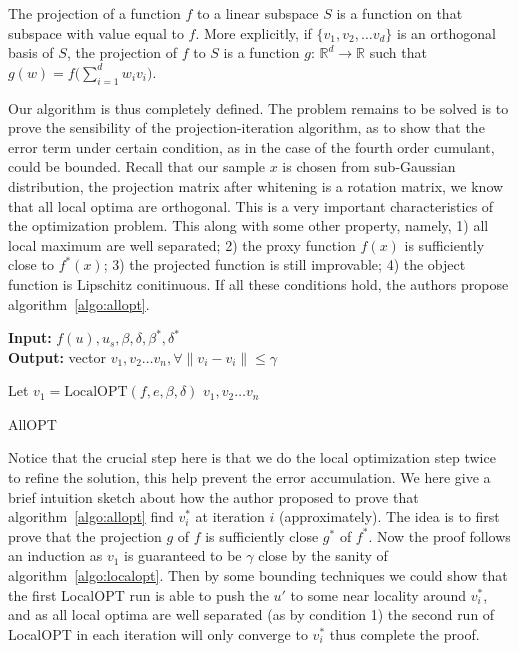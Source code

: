 \begin{definition}
    The projection of a function $f$ to a linear subspace $S$ is a function on that subspace with value equal to $f$. More explicitly, if $\{v_1, v_2, \dots v_d\}$ is an orthogonal basis of $S$, the projection of $f$ to $S$ is a function $g$: $\mathbb{R}^d \rightarrow \mathbb{R}$ such that $g(w) = f\big(\sum_{i = 1}^d w_iv_i\big)$.
\end{definition}

Our algorithm is thus completely defined. The problem remains to be
solved is to prove the sensibility of the projection-iteration
algorithm, as to show that the error term under certain condition, as
in the case of the fourth order cumulant, could be bounded. Recall
that our sample $x$ is chosen from sub-Gaussian distribution, the
projection matrix after whitening is a rotation matrix, we know that
all local optima are orthogonal. This is a very important
characteristics of the optimization problem. This along with some
other property, namely, 1) all local maximum are well separated; 2)
the proxy function $f(x)$ is sufficiently close to $f^*(x)$; 3) the
projected function is still improvable; 4) the object function is
Lipschitz conitinuous. If all these conditions hold, the authors
propose algorithm~\ref{algo:allopt}.

\begin{algorithm}[t]
\hspace*{\algorithmicindent} \textbf{Input:} $f(u), u_s, \beta, \delta, \beta^*, \delta^*$\\
\hspace*{\algorithmicindent} \textbf{Output:} vector $v_1, v_2
\dots v_n, \forall \|v_i - v_i\| \leq \gamma$
\begin{algorithmic}
    \STATE Let $v_1 = \text{LocalOPT}(f, e, \beta, \delta)$
    \ENDFOR
    \RETURN $v_1, v_2 \dots v_n$
\end{algorithmic}
\caption{AllOPT}
\label{algo:allopt}
\end{algorithm}

Notice that the crucial step here is that we do the local
optimization step twice to refine the solution, this help prevent the
error accumulation. We here give a brief intuition sketch about how
the author proposed to prove that algorithm~\ref{algo:allopt} find
$v_i^*$ at iteration $i$ (approximately). The idea is to first prove
that the projection $g$ of $f$ is sufficiently close $g^*$ of $f^*$.
Now the proof follows an induction as $v_1$ is guaranteed to be
$\gamma$ close by the sanity of algorithm~\ref{algo:localopt}. Then
by some bounding techniques we could show that the first LocalOPT run
is able to push the  $u'$ to some near locality around  $v_i^*$, and
as all local optima are well separated (as by condition 1) the second
run of LocalOPT in each iteration will only converge to $v_i^*$ thus
complete the proof.

